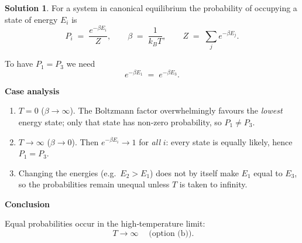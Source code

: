 \documentclass[12pt]{article}
\theoremstyle{definition} %
\newtheorem{solution}{Solution}
\theoremstyle{plain} %
\begin{document}
    \begin{solution}
      For a system in canonical equilibrium the probability of occupying a state of
      energy \(E_i\) is
      \[
      P_i \;=\; \frac{e^{-\beta E_i}}{Z},
      \qquad
      \beta \;=\; \frac{1}{k_B T},
      \qquad
      Z \;=\; \sum_j e^{-\beta E_j}.
      \]
      
      To have \(P_1 = P_3\) we need
      \[
      e^{-\beta E_1} \;=\; e^{-\beta E_3}.
      \]
      
      \textbf{Case analysis}
      
      \begin{enumerate}
        \item \(\displaystyle T = 0\) (\(\beta \to \infty\)).  
              The Boltzmann factor overwhelmingly favours the \emph{lowest} energy
              state; only that state has non‑zero probability, so \(P_1 \neq P_3\).
      
        \item \(\displaystyle T \to \infty\) (\(\beta \to 0\)).  
              Then \(e^{-\beta E_i} \to 1\) for \emph{all} \(i\):
              every state is equally likely, hence \(P_1 = P_3\).
      
        \item Changing the energies (e.g.\ \(E_2 > E_1\)) does not by itself make
              \(E_1\) equal to \(E_3\), so the probabilities remain unequal unless
              \(T\) is taken to infinity.
      \end{enumerate}
      
      \textbf{Conclusion}
      
      Equal probabilities occur in the high‑temperature limit:
      \[
      \boxed{\;T \to \infty\;} \quad\text{(option (b)).}
      \]
      \end{solution}
\end{document}
